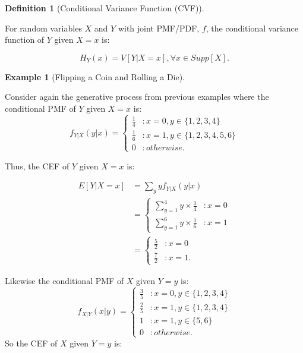\documentclass[
]{article}
\theoremstyle{definition}
\newtheorem{definition}{Definition}[section]
\theoremstyle{definition}
\newtheorem{example}{Example}[section]
\theoremstyle{definition}
\theoremstyle{remark}
\begin{document}
\begin{definition}[Conditional Variance Function (CVF)]
\protect\hypertarget{def:unlabeled-div-95}{}\label{def:unlabeled-div-95}

For random variables \(X\) and \(Y\) with joint PMF/PDF, \(f\), the conditional variance function of \(Y\) given \(X=x\) is:

\[H_Y(x) = V[Y | X=x], \forall x \in Supp[X].\]

\end{definition}

\begin{example}[Flipping a Coin and Rolling a Die]
\protect\hypertarget{exm:unlabeled-div-96}{}\label{exm:unlabeled-div-96}

Consider again the generative process from previous examples where the conditional PMF of \(Y\) given \(X=x\) is:
\[f_{Y|X}(y|x) = \begin{cases}\frac{1}{4} &: x=0, y \in \{1,2,3,4\} \\ \frac{1}{6} &: x=1, y \in \{1,2,3,4,5,6\} \\ 0 &: otherwise. \end{cases}\]

Thus, the CEF of \(Y\) given \(X=x\) is:

\begin{align}
E[Y | X=x] &= \sum_y yf_{Y|X}(y|x) \\
           &= \begin{cases} \sum_{y=1}^4 y \times \frac{1}{4} &: x=0 \\ 
                            \sum_{y=1}^6 y \times \frac{1}{6} &: x=1
                            \end{cases} \\
           &= \begin{cases} \frac{5}{2} &: x=0 \\ 
                            \frac{7}{2} &: x=1.
                            \end{cases}
\end{align}

Likewise the conditional PMF of \(X\) given \(Y=y\) is:
\[f_{X|Y}(x|y) = \begin{cases}\frac{3}{5} &: x=0, y \in \{1,2,3,4\} \\ \frac{2}{5} &: x=1, y \in \{1,2,3,4\} \\ 1 &: x=1, y \in \{5,6\} \\ 0 &: otherwise. \end{cases}\]
So the CEF of \(X\) given \(Y=y\) is:


\end{example}
\end{document}
